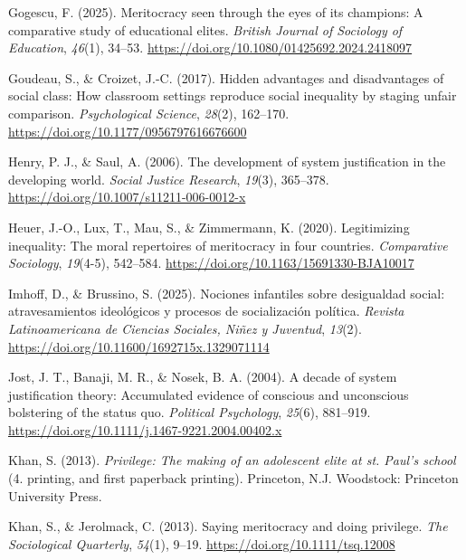 \documentclass[
  13pt,
]{article}
\newlength{\cslhangindent}
\newenvironment{CSLReferences}[2] %
 {\begin{list}{}{%
  \setlength{\itemindent}{0pt}
  \setlength{\leftmargin}{0pt}
  \setlength{\parsep}{0pt}
  \ifodd #1
   \setlength{\leftmargin}{\cslhangindent}
   \setlength{\itemindent}{-1\cslhangindent}
  \fi
  \setlength{\itemsep}{#2\baselineskip}}}
 {\end{list}}
\begin{document}
\begin{CSLReferences}{1}{0}
Gogescu, F. (2025). Meritocracy seen through the eyes of its champions:
A comparative study of educational elites. \emph{British Journal of
Sociology of Education}, \emph{46}(1), 34--53.
\url{https://doi.org/10.1080/01425692.2024.2418097}

Goudeau, S., \& Croizet, J.-C. (2017). Hidden advantages and
disadvantages of social class: How classroom settings reproduce social
inequality by staging unfair comparison. \emph{Psychological Science},
\emph{28}(2), 162--170. \url{https://doi.org/10.1177/0956797616676600}

Henry, P. J., \& Saul, A. (2006). The development of system
justification in the developing world. \emph{Social Justice Research},
\emph{19}(3), 365--378. \url{https://doi.org/10.1007/s11211-006-0012-x}

Heuer, J.-O., Lux, T., Mau, S., \& Zimmermann, K. (2020). Legitimizing
inequality: The moral repertoires of meritocracy in four countries.
\emph{Comparative Sociology}, \emph{19}(4-5), 542--584.
\url{https://doi.org/10.1163/15691330-BJA10017}

Imhoff, D., \& Brussino, S. (2025). Nociones infantiles sobre
desigualdad social: atravesamientos ideológicos y procesos de
socialización política. \emph{Revista Latinoamericana de Ciencias
Sociales, Niñez y Juventud}, \emph{13}(2).
\url{https://doi.org/10.11600/1692715x.1329071114}

Jost, J. T., Banaji, M. R., \& Nosek, B. A. (2004). A decade of system
justification theory: Accumulated evidence of conscious and unconscious
bolstering of the status quo. \emph{Political Psychology}, \emph{25}(6),
881--919. \url{https://doi.org/10.1111/j.1467-9221.2004.00402.x}

Khan, S. (2013). \emph{Privilege: The making of an adolescent elite at
st. Paul's school} (4. printing, and first paperback printing).
Princeton, N.J. Woodstock: Princeton University Press.

Khan, S., \& Jerolmack, C. (2013). Saying meritocracy and doing
privilege. \emph{The Sociological Quarterly}, \emph{54}(1), 9--19.
\url{https://doi.org/10.1111/tsq.12008}


\end{CSLReferences}
\end{document}
